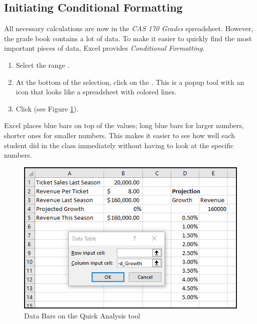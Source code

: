 \subsection{Initiating Conditional Formatting}

All necessary calculations are now in the \textit{CAS 170 Grades} spreadsheet. However, the grade book contains a lot of data. To make it easier to quickly find the most important pieces of data, Excel provides \textit{Conditional Formatting}.

\begin{enumbox}
	\begin{enumerate}
		\item Select the range .
		\item At the bottom of the selection, click on the . This is a popup tool with an icon that looks like a spreadsheet with colored lines.
		\item Click  (see Figure \ref{03:fig18}).
	\end{enumerate}
\end{enumbox}
	
Excel places blue bars on top of the values; long blue bars for larger numbers, shorter ones for smaller numbers. This makes it easier to see how well each student did in the class immediately without having to look at the specific numbers.

\begin{figure}[H]
	\centering
	\includegraphics[width=\maxwidth{.95\linewidth}]{gfx/ch03_fig18}
	\caption{Data Bars on the Quick Analysis tool}
	\label{03:fig18}
\end{figure}

